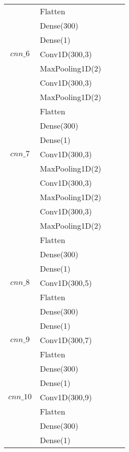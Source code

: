 \begin{longtable}{| c | m{0.58\linewidth} | r | m{0.1\linewidth} |}
                & Flatten                       \\
                & Dense(300)                    \\
                & Dense(1)                      \\ \hline
    $cnn\_6$    & Conv1D(300,3)                 \\
                & MaxPooling1D(2)               \\
                & Conv1D(300,3)                 \\
                & MaxPooling1D(2)               \\
                & Flatten                       \\
                & Dense(300)                    \\
                & Dense(1)                      \\ \hline

    $cnn\_7$    & Conv1D(300,3)                 \\
                & MaxPooling1D(2)               \\
                & Conv1D(300,3)                 \\
                & MaxPooling1D(2)               \\
                & Conv1D(300,3)                 \\
                & MaxPooling1D(2)               \\
                & Flatten                       \\
                & Dense(300)                    \\
                & Dense(1)                      \\ \hline
    $cnn\_8$    & Conv1D(300,5)                 \\
                & Flatten                       \\
                & Dense(300)                    \\
                & Dense(1)                      \\ \hline
    $cnn\_9$    & Conv1D(300,7)                 \\
                & Flatten                       \\
                & Dense(300)                    \\
                & Dense(1)                      \\ \hline
    $cnn\_10$   & Conv1D(300,9)                 \\
                & Flatten                       \\
                & Dense(300)                    \\
                & Dense(1)                      \\ \hline



\end{longtable}
